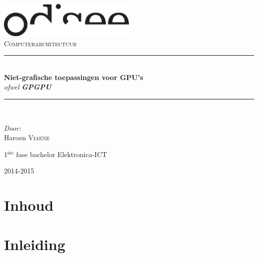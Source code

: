 \documentclass[11pt, a4paper]{article}
\newcommand{\HRule}{\rule{\linewidth}{0.5mm}}
\begin{document}
\begin{titlepage}
\begin{center}
\includegraphics[width=0.5\textwidth]{./logo.pdf}~\\[1cm]


\textsc{\Large Computerarchitectuur}\\[0.5cm]

\HRule \\[0.4cm]
{ \LARGE \bfseries Niet-grafische toepassingen voor GPU's}\\[0.4cm]
{\large \textit{ofwel \textbf{GPGPU}}}\\[0.2cm]

\HRule \\[1.5cm]

\begin{minipage}{0.4\textwidth}
\begin{flushleft} \large
\emph{Door:}\\
Haroen \textsc{Viaene}\\

\end{flushleft}
\end{minipage}
\begin{minipage}{0.4\textwidth}
\begin{flushright} \large
\large{1$^{\text{ste}}$ fase bachelor Elektronica-ICT}\\
\end{flushright}
\end{minipage}

\vfill

{\large 2014-2015}

\end{center}
\end{titlepage}

\newpage

\section*{Inhoud}

\tableofcontents

\newpage

\section{Inleiding}
\end{document}
